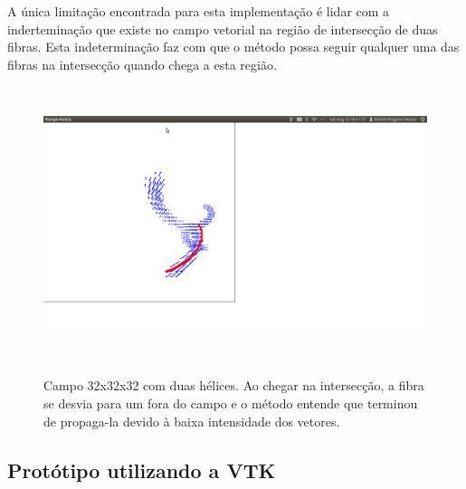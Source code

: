   A única limitação encontrada para esta implementação é lidar com a inderteminação que existe no campo vetorial na região de intersecção de duas fibras. Esta indeterminação faz com que o método possa seguir qualquer uma das fibras na intersecção quando chega a esta região.
  
  \begin{figure}[!h]
    \begin{center}
      \includegraphics[width=140mm, height=80mm]{images/fibraecampo.png}
      \label{fig:}
      \caption{Campo 32x32x32 com duas hélices. Ao chegar na intersecção, a fibra se desvia para um fora do campo e o método entende que terminou de propaga-la devido à baixa intensidade dos vetores.}
    \end{center}
  \end{figure}
  
  \newpage
  \subsection{Protótipo utilizando a VTK}
